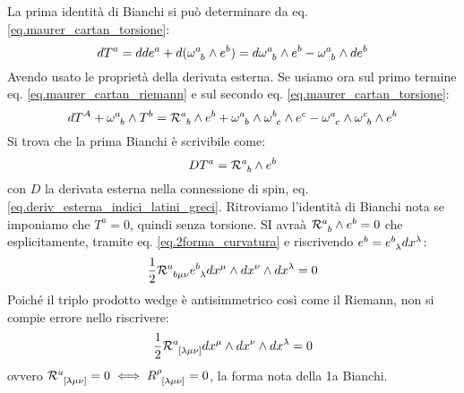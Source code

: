 La prima identità di Bianchi si può determinare da eq. \ref{eq.maurer_cartan_torsione}:
\begin{equation*}
    dT^a = dde^a + d(\tensor{\omega}{^a_b}\wedge e^b) = d\tensor{\omega}{^a_b}\wedge e^b - \tensor{\omega}{^a_b}\wedge d e^b
\end{equation*}
Avendo usato le proprietà della derivata esterna. Se usiamo ora sul primo termine eq. \ref{eq.maurer_cartan_riemann} e sul secondo eq. \ref{eq.maurer_cartan_torsione}:
\begin{equation*}
    dT^A + \tensor{\omega}{^a_b}\wedge T^b = \tensor{\mathcal R}{^a_b}\wedge e^b + \tensor{\omega}{^a_b}\wedge \tensor{\omega}{^b_c}\wedge e^c -\tensor{\omega}{^a_c}\wedge \tensor{\omega}{^c_b}\wedge e^b
\end{equation*}
Si trova che la prima Bianchi è scrivibile come:
\begin{equation}
    DT^a = \tensor{\mathcal R}{^a_b}\wedge e^b
    \label{eq.prima_bianchi_connessione_spin}
\end{equation}
con $D$ la derivata esterna nella connessione di spin, eq. \ref{eq.deriv_esterna_indici_latini_greci}.
Ritroviamo l'identità di Bianchi nota se imponiamo che $T^a = 0$, quindi senza torsione. SI avraà $\tensor{\mathcal R}{^a_b}\wedge e^b = 0$ che esplicitamente, tramite eq. \ref{eq.2forma_curvatura} e riscrivendo $e^b = \tensor{e}{^b_\lambda}dx^\lambda$:
\begin{equation*}
    \frac{1}{2}\tensor{\mathcal R}{^a_{b\mu\nu}} \tensor{e}{^b_\lambda} dx^\mu \wedge dx^\nu \wedge dx^\lambda = 0
\end{equation*}
Poiché il triplo prodotto wedge è antisimmetrico così come il Riemann, non si compie errore nello riscrivere:
\begin{equation*}
    \frac{1}{2}\tensor{\mathcal R}{^a_{[\lambda\mu\nu]}} dx^\mu \wedge dx^\nu \wedge dx^\lambda = 0
\end{equation*}
ovvero $\tensor{\mathcal R}{^a_{[\lambda\mu\nu]}} = 0 \iff \tensor{R}{^\rho_{[\lambda \mu\nu]}} = 0$, la forma nota della 1a Bianchi.


